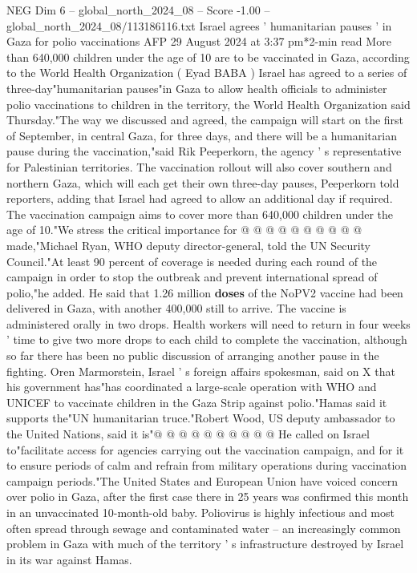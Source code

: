 \begin{textsample}{NEG Dim 6 – global\_north\_2024\_08 – Score -1.00 – global\_north\_2024\_08/113186116.txt}  \label{ex:f6_neg_069}
Israel agrees ' humanitarian pauses ' in Gaza for polio vaccinations AFP 29 August 2024 at 3:37 pm*2-min read More than 640,000 children under the age of 10 are to be vaccinated in Gaza, according to the World Health Organization ( Eyad BABA ) Israel has agreed to a series of three-day"humanitarian pauses"in Gaza to allow health officials to administer polio vaccinations to children in the territory, the World Health Organization said Thursday."The way we discussed and agreed, the campaign will start on the first of September, in central Gaza, for three days, and there will be a humanitarian pause during the vaccination,"said Rik Peeperkorn, the agency ' s representative for Palestinian territories.
The vaccination rollout will also cover southern and northern Gaza, which will each get their own three-day pauses, Peeperkorn told reporters, adding that Israel had agreed to allow an additional day if required.
The vaccination campaign aims to cover more than 640,000 children under the age of 10."We stress the critical importance for @ @ @ @ @ @ @ @ @ @ made,"Michael Ryan, WHO deputy director-general, told the UN Security Council."At least 90 percent of coverage is needed during each round of the campaign in order to stop the outbreak and prevent international spread of polio,"he added.
He said that 1.26 million \textbf{doses} of the NoPV2 vaccine had been delivered in Gaza, with another 400,000 still to arrive.
The vaccine is administered orally in two drops.
Health workers will need to return in four weeks ' time to give two more drops to each child to complete the vaccination, although so far there has been no public discussion of arranging another pause in the fighting.
Oren Marmorstein, Israel ' s foreign affairs spokesman, said on X that his government has"has coordinated a large-scale operation with WHO and UNICEF to vaccinate children in the Gaza Strip against polio."Hamas said it supports the"UN humanitarian truce."Robert Wood, US deputy ambassador to the United Nations, said it is"@ @ @ @ @ @ @ @ @ @ He called on Israel to"facilitate access for agencies carrying out the vaccination campaign, and for it to ensure periods of calm and refrain from military operations during vaccination campaign periods."The United States and European Union have voiced concern over polio in Gaza, after the first case there in 25 years was confirmed this month in an unvaccinated 10-month-old baby.
Poliovirus is highly infectious and most often spread through sewage and contaminated water -- an increasingly common problem in Gaza with much of the territory ' s infrastructure destroyed by Israel in its war against Hamas.

\end{textsample}
